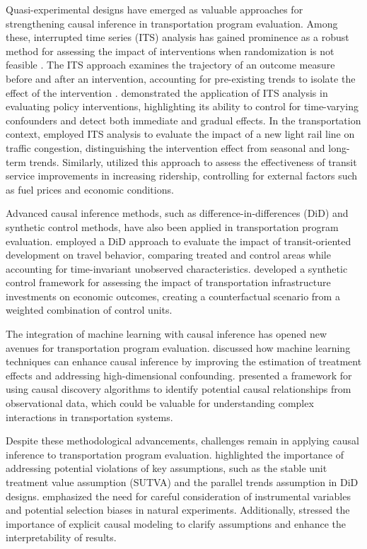 \documentclass[a4paper,fleqn,12pt]{cas-sc}
\begin{document}
Quasi-experimental designs have emerged as valuable approaches for strengthening causal inference in transportation program evaluation. Among these, interrupted time series (ITS) analysis has gained prominence as a robust method for assessing the impact of interventions when randomization is not feasible \citep{bernal2017interrupted, lopez2017interrupted}. The ITS approach examines the trajectory of an outcome measure before and after an intervention, accounting for pre-existing trends to isolate the effect of the intervention \citep{wagner2002segmented, bernal2016methodological}. \cite{kontopantelis2015regression} demonstrated the application of ITS analysis in evaluating policy interventions, highlighting its ability to control for time-varying confounders and detect both immediate and gradual effects. In the transportation context, \cite{morrison2018impact} employed ITS analysis to evaluate the impact of a new light rail line on traffic congestion, distinguishing the intervention effect from seasonal and long-term trends. Similarly, \cite{baek2016using} utilized this approach to assess the effectiveness of transit service improvements in increasing ridership, controlling for external factors such as fuel prices and economic conditions.

Advanced causal inference methods, such as difference-in-differences (DiD) and synthetic control methods, have also been applied in transportation program evaluation. \cite{hong2020causal} employed a DiD approach to evaluate the impact of transit-oriented development on travel behavior, comparing treated and control areas while accounting for time-invariant unobserved characteristics. \cite{ye2020causal} developed a synthetic control framework for assessing the impact of transportation infrastructure investments on economic outcomes, creating a counterfactual scenario from a weighted combination of control units.

The integration of machine learning with causal inference has opened new avenues for transportation program evaluation. \cite{athey2017state} discussed how machine learning techniques can enhance causal inference by improving the estimation of treatment effects and addressing high-dimensional confounding. \cite{spirtes2016causal} presented a framework for using causal discovery algorithms to identify potential causal relationships from observational data, which could be valuable for understanding complex interactions in transportation systems.

Despite these methodological advancements, challenges remain in applying causal inference to transportation program evaluation. \cite{imbens2015causal} highlighted the importance of addressing potential violations of key assumptions, such as the stable unit treatment value assumption (SUTVA) and the parallel trends assumption in DiD designs. \cite{angrist2008mostly} emphasized the need for careful consideration of instrumental variables and potential selection biases in natural experiments. Additionally, \cite{pearl2009causality} stressed the importance of explicit causal modeling to clarify assumptions and enhance the interpretability of results.
\end{document}
